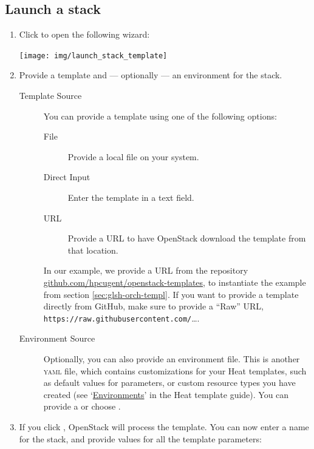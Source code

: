 \subsection*{Launch a stack}
\begin{enumerate}
\item Click  to open the following wizard:
\begin{center}
  \texttt{[image: img/launch\_stack\_template]}
\end{center}
\item Provide a template and --- optionally --- an environment for the stack.
\begin{description}
\item[Template Source] You can provide a template using one of the
  following options:
  \begin{description}
  \item[File] Provide a local file on your system.
  \item[Direct Input] Enter the template in a text field.
  \item[URL] Provide a \textsc{URL} to have OpenStack download the
    template from that location.
  \end{description}
  In our example, we provide a \textsc{URL} from the repository
  \href{https://github.com/hpcugent/openstack-templates}{github.com/hpcugent/openstack-templates},
  to instantiate the example from section \ref{sec:glsh-orch-templ}.
  If you want to provide a template directly from GitHub, make sure to
  provide a ``Raw'' \textsc{URL},
  \lstinline{https://raw.githubusercontent.com/}\ldots.

\item[Environment Source] Optionally, you can also provide an
  environment file.  This is another \textsc{yaml} file, which
  contains customizations for your Heat templates, such as default
  values for parameters, or custom resource types you have created
  (see
  `\href{https://docs.openstack.org/heat/\osversion/template_guide/environment.html}{Environments}'
  in the Heat template guide).  You can provide a  or
  choose .
\end{description}
\item If you click , OpenStack will process the template.
  You can now enter a name for the stack, and provide values for all
  the template parameters:


\end{enumerate}

